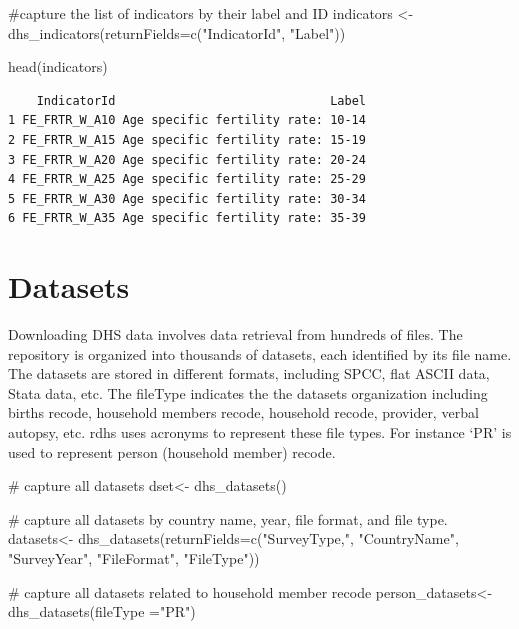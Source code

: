 \documentclass[
  letterpaper,
  DIV=11,
  numbers=noendperiod]{scrreprt}
\newenvironment{Shaded}{\begin{snugshade}}{\end{snugshade}}
\newcommand{\AttributeTok}[1]{\textcolor[rgb]{0.40,0.45,0.13}{#1}}
\newcommand{\CommentTok}[1]{\textcolor[rgb]{0.37,0.37,0.37}{#1}}
\newcommand{\FunctionTok}[1]{\textcolor[rgb]{0.28,0.35,0.67}{#1}}
\newcommand{\NormalTok}[1]{\textcolor[rgb]{0.00,0.23,0.31}{#1}}
\newcommand{\OtherTok}[1]{\textcolor[rgb]{0.00,0.23,0.31}{#1}}
\newcommand{\StringTok}[1]{\textcolor[rgb]{0.13,0.47,0.30}{#1}}
\begin{document}
\begin{Shaded}
\begin{Highlighting}[]
\CommentTok{\#capture the list of indicators by their label and ID}
\NormalTok{indicators }\OtherTok{\textless{}{-}} \FunctionTok{dhs\_indicators}\NormalTok{(}\AttributeTok{returnFields=}\FunctionTok{c}\NormalTok{(}\StringTok{"IndicatorId"}\NormalTok{, }\StringTok{"Label"}\NormalTok{))}

\FunctionTok{head}\NormalTok{(indicators)}
\end{Highlighting}
\end{Shaded}

\begin{verbatim}
    IndicatorId                              Label
1 FE_FRTR_W_A10 Age specific fertility rate: 10-14
2 FE_FRTR_W_A15 Age specific fertility rate: 15-19
3 FE_FRTR_W_A20 Age specific fertility rate: 20-24
4 FE_FRTR_W_A25 Age specific fertility rate: 25-29
5 FE_FRTR_W_A30 Age specific fertility rate: 30-34
6 FE_FRTR_W_A35 Age specific fertility rate: 35-39
\end{verbatim}

\hypertarget{datasets}{%
\section{Datasets}\label{datasets}}

Downloading DHS data involves data retrieval from hundreds of files. The
repository is organized into thousands of datasets, each identified by
its file name. The datasets are stored in different formats, including
SPCC, flat ASCII data, Stata data, etc. The fileType indicates the the
datasets organization including births recode, household members recode,
household recode, provider, verbal autopsy, etc. rdhs uses acronyms to
represent these file types. For instance `PR' is used to represent
person (household member) recode.

\begin{Shaded}
\begin{Highlighting}[]
\CommentTok{\# capture all datasets}
\NormalTok{dset}\OtherTok{\textless{}{-}} \FunctionTok{dhs\_datasets}\NormalTok{()}

\CommentTok{\# capture all datasets by country name, year, file format, and file type. }
\NormalTok{datasets}\OtherTok{\textless{}{-}} \FunctionTok{dhs\_datasets}\NormalTok{(}\AttributeTok{returnFields=}\FunctionTok{c}\NormalTok{(}\StringTok{"SurveyType,"}\NormalTok{, }\StringTok{"CountryName"}\NormalTok{, }\StringTok{"SurveyYear"}\NormalTok{, }\StringTok{"FileFormat"}\NormalTok{, }\StringTok{"FileType"}\NormalTok{))}

\CommentTok{\# capture all datasets related to household member recode}
\NormalTok{person\_datasets}\OtherTok{\textless{}{-}} \FunctionTok{dhs\_datasets}\NormalTok{(}\AttributeTok{fileType =}\StringTok{"PR"}\NormalTok{)}
\end{Highlighting}
\end{Shaded}
\end{document}
